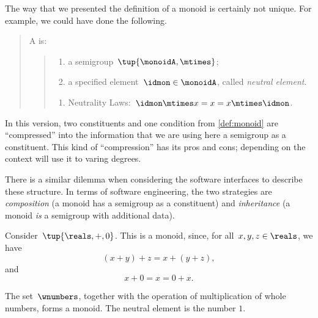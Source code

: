 \begin{remark}
  The way that we presented the definition of a monoid is certainly not unique. For example, we could have done the following.

  \begin{quote}
    A \emph{} is:
    \begin{quote}
      \constit
      \begin{enumerate}
        \item a semigroup~$\tup{\monoidA, \mtimes}$;
        \item a specified element~$\idmon\in \monoidA$, called \emph{neutral element}.
      \end{enumerate}
      \condit
      \begin{enumerate}
        \item Neutrality Laws:~$\idmon\mtimes x=x=x\mtimes \idmon$.
      \end{enumerate}
    \end{quote}
  \end{quote}
  In this version, two constituents and one condition from \cref{def:monoid} are ``compressed'' into the information that we are using here a semigroup as a constituent. This kind of ``compression'' has its pros and cons; depending on the context will use it to varing degrees.

  There is a similar dilemma when considering the software interfaces to describe these structure.
  In terms of software engineering, the two strategies are \emph{composition} (a monoid has a semigroup as a constituent)
  and \emph{inheritance} (a monoid \emph{is} a semigroup with additional data).

\end{remark}



\begin{example}
  Consider~$\tup{\reals,+,0}$. This is a monoid, since, for all~$x,y, z \in \reals$, we have
  \begin{equation*}
  (x+y)
    +z=x+(y+z),
  \end{equation*}
  and
  \begin{equation*}
    x+0=x=0+x.
  \end{equation*}
\end{example}

\begin{example}
  The set~$\wnumbers$, together with the operation of multiplication of whole numbers, forms a monoid. The neutral element is the number $1$.
\end{example}


